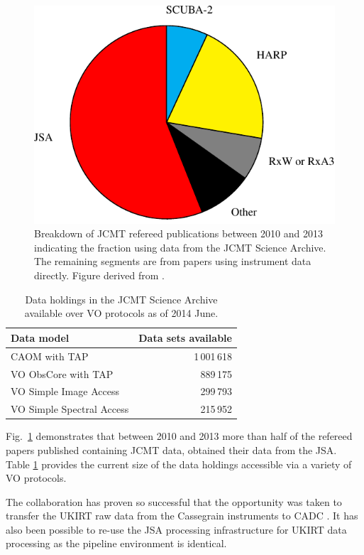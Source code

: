 \documentclass[final,authoryear,5p,times,twocolumn]{elsarticle}
\begin{document}
\begin{figure}[t]
\includegraphics[width=\columnwidth]{jcmt-pubs-crop}
\caption{Breakdown of JCMT refereed publications between 2010 and
    2013 indicating the fraction using data from the JCMT Science
    Archive. The remaining segments are from papers using instrument
    data directly. Figure derived from \citet{2014SPIE9152-93}.}
\label{fig:jsapubs}
\end{figure}

\begin{table}
\caption{Data holdings in the JCMT Science Archive available over VO
  protocols as of 2014 June.}
\label{tab:cadcvo}
\begin{center}
\begin{tabular}{|l|r|}
\hline
Data model & Data sets available\\ \hline
CAOM with TAP & 1\,001\,618 \\
VO ObsCore with TAP & 889\,175\\
VO Simple Image Access & 299\,793\\
VO Simple Spectral Access & 215\,952\\ \hline
\end{tabular}
\end{center}
\end{table}

Fig.~\ref{fig:jsapubs} demonstrates that between 2010 and 2013 more
than half of the refereed papers published containing JCMT data,
obtained their data from the JSA. Table \ref{tab:cadcvo} provides the
current size of the data holdings accessible via a variety of VO protocols.


The collaboration has proven so successful that the opportunity was
taken to transfer the UKIRT raw data from the Cassegrain instruments
to CADC \citep{adassxxiii_P01}. It has also been possible to re-use
the JSA processing infrastructure for UKIRT data processing as the
pipeline environment is identical.
\end{document}
